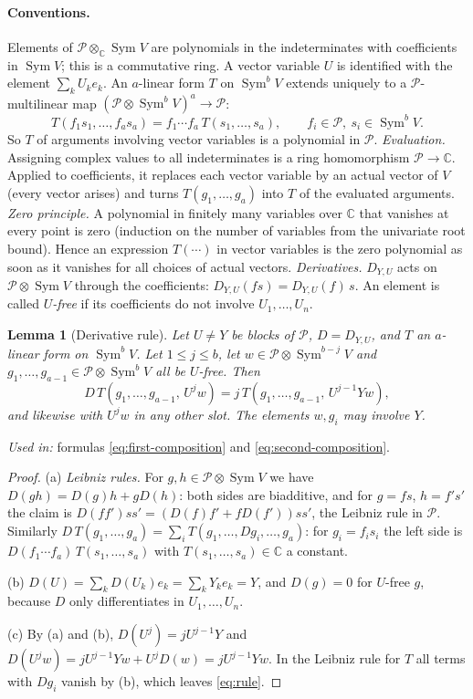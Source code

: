 \documentclass[11pt]{article}
\newtheorem{lemma}[theorem]{Lemma}
\theoremstyle{remark}
\DeclareMathOperator{\Sym}{Sym}
\newcommand{\C}{\mathbb C}
\newcommand{\D}[2]{D_{#1,#2}}
\newcommand{\PP}{\mathcal P}
\begin{document}
\paragraph{Conventions.}
Elements of $\PP\otimes_\C\Sym V$ are polynomials in the indeterminates with
coefficients in $\Sym V$; this is a commutative ring. A vector variable $U$
is identified with the element $\sum_kU_ke_k$. An $a$-linear form $T$ on
$\Sym^bV$ extends uniquely to a $\PP$-multilinear map
$(\PP\otimes\Sym^bV)^a\to\PP$:
\[
 T(f_1s_1,\dots,f_as_a)=f_1\cdots f_a\,T(s_1,\dots,s_a),
 \qquad f_i\in\PP,\ s_i\in\Sym^bV .
\]
So $T$ of arguments involving vector variables is a polynomial in $\PP$.
\emph{Evaluation.} Assigning complex values to all indeterminates is a ring
homomorphism $\PP\to\C$. Applied to coefficients, it replaces each vector
variable by an actual vector of $V$ (every vector arises) and turns
$T(g_1,\dots,g_a)$ into $T$ of the evaluated arguments.
\emph{Zero principle.} A polynomial in finitely many variables over $\C$
that vanishes at every point is zero (induction on the number of variables
from the univariate root bound). Hence an expression $T(\cdots)$ in vector
variables is the zero polynomial as soon as it vanishes for all choices of
actual vectors.
\emph{Derivatives.} $\D{Y}{U}$ acts on $\PP\otimes\Sym V$ through the
coefficients: $\D{Y}{U}(fs)=\D{Y}{U}(f)\,s$. An element is called
\emph{$U$-free} if its coefficients do not involve $U_1,\dots,U_n$.

\begin{lemma}[Derivative rule]\label{lem:deriv}
Let $U\ne Y$ be blocks of $\PP$, $D=\D{Y}{U}$, and $T$ an $a$-linear form
on $\Sym^bV$. Let $1\le j\le b$, let $w\in\PP\otimes\Sym^{b-j}V$ and
$g_1,\dots,g_{a-1}\in\PP\otimes\Sym^bV$ all be $U$-free. Then
\begin{equation}\label{eq:rule}
 D\,T(g_1,\dots,g_{a-1},\,U^jw)
 =j\,T(g_1,\dots,g_{a-1},\,U^{j-1}Yw),
\end{equation}
and likewise with $U^jw$ in any other slot. The elements $w,g_i$ may
involve $Y$.
\end{lemma}

\noindent\emph{Used in:} formulas \eqref{eq:first-composition} and
\eqref{eq:second-composition}.

\begin{proof}
(a) \emph{Leibniz rules.} For $g,h\in\PP\otimes\Sym V$ we have
$D(gh)=D(g)h+gD(h)$: both sides are biadditive, and for $g=fs$, $h=f's'$
the claim is $D(ff')ss'=(D(f)f'+fD(f'))ss'$, the Leibniz rule in $\PP$.
Similarly
$D\,T(g_1,\dots,g_a)=\sum_iT(g_1,\dots,Dg_i,\dots,g_a)$: for $g_i=f_is_i$
the left side is $D(f_1\cdots f_a)\,T(s_1,\dots,s_a)$ with
$T(s_1,\dots,s_a)\in\C$ a constant.

(b) $D(U)=\sum_kD(U_k)e_k=\sum_kY_ke_k=Y$, and $D(g)=0$ for $U$-free $g$,
because $D$ only differentiates in $U_1,\dots,U_n$.

(c) By (a) and (b), $D(U^j)=jU^{j-1}Y$ and
$D(U^jw)=jU^{j-1}Yw+U^jD(w)=jU^{j-1}Yw$. In the Leibniz rule for $T$ all
terms with $Dg_i$ vanish by (b), which leaves \eqref{eq:rule}.
\end{proof}
\end{document}
